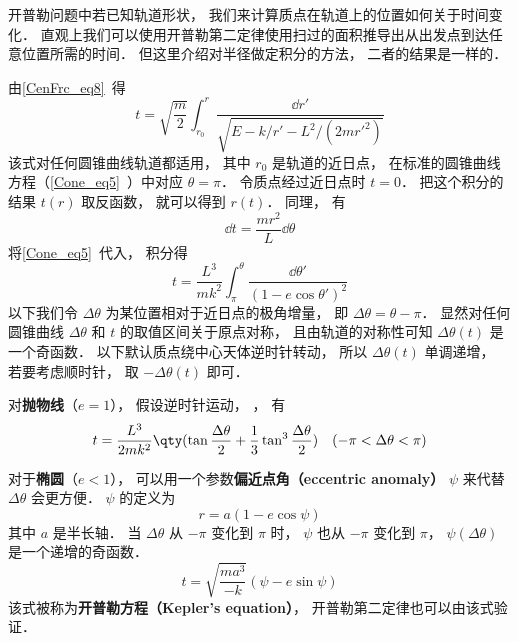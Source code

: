

开普勒问题中若已知轨道形状， 我们来计算质点在轨道上的位置如何关于时间变化． 直观上我们可以使用开普勒第二定律使用扫过的面积推导出从出发点到达任意位置所需的时间． 但这里介绍对半径做定积分的方法， 二者的结果是一样的．

由\autoref{CenFrc_eq8}~得
\begin{equation}
t = \sqrt{\frac{m}{2}} \int_{r_0}^r \frac{\dd{r'}}{\sqrt{E - k/r' - L^2/(2mr'^2)}}
\end{equation}
该式对任何圆锥曲线轨道都适用， 其中 $r_0$ 是轨道的近日点， 在标准的圆锥曲线方程（\autoref{Cone_eq5}~）中对应 $\theta = \pi$． 令质点经过近日点时 $t= 0$． 把这个积分的结果 $t(r)$ 取反函数， 就可以得到 $r(t)$． 同理， 有
\begin{equation}
\dd{t} = \frac{mr^2}{L}\dd{\theta}
\end{equation}
将\autoref{Cone_eq5}~代入， 积分得
\begin{equation}
t = \frac{L^3}{mk^2} \int_{\pi}^\theta \frac{\dd{\theta'}}{(1 - e\cos \theta')^2 }
\end{equation}
以下我们令 $\Delta\theta$ 为某位置相对于近日点的极角增量， 即 $\Delta \theta = \theta - \pi$． 显然对任何圆锥曲线 $\Delta \theta$ 和 $t$ 的取值区间关于原点对称， 且由轨道的对称性可知 $\Delta\theta(t)$ 是一个奇函数． 以下默认质点绕中心天体逆时针转动， 所以 $\Delta\theta(t)$ 单调递增， 若要考虑顺时针， 取 $-\Delta\theta(t)$ 即可．

对\textbf{抛物线}（$e = 1$）， 假设逆时针运动， ， 有
\begin{equation}\label{EqMoKp_eq3}
t = \frac{L^3}{2mk^2} \qty(\tan\frac{\Delta\theta}{2} +  \frac{1}{3}\tan^3 \frac{\Delta\theta}{2})\quad (-\pi<\Delta\theta<\pi)
\end{equation}

对于\textbf{椭圆}（$e < 1$）， 可以用一个参数\textbf{偏近点角（eccentric anomaly）} $\psi$ 来代替 $\Delta\theta$ 会更方便． $\psi$ 的定义为
\begin{equation}\label{EqMoKp_eq1}
r = a(1-e\cos\psi)
\end{equation}
其中 $a$ 是半长轴． 当 $\Delta\theta $ 从 $-\pi$ 变化到 $\pi$ 时， $\psi$ 也从 $-\pi$ 变化到 $\pi$， $\psi(\Delta\theta)$ 是一个递增的奇函数．
\begin{equation}\label{EqMoKp_eq5}
t = \sqrt{\frac{ma^3}{-k}} (\psi - e \sin\psi)
\end{equation}
该式被称为\textbf{开普勒方程（Kepler's equation）}， 开普勒第二定律也可以由该式验证．


